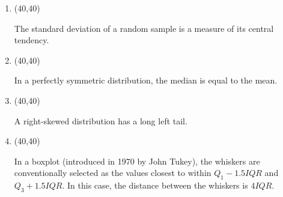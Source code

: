 \documentclass[11pt,twoside]{article}
\numberwithin{equation}{section}
\newcommand{\?}{\stackrel{?}{=}}
\newcommand{\gr}{\color{green!40!black}}
\begin{document}
\begin{enumerate}[\bf (i)]
\item \hfill
  \begin{minipage}{.1\linewidth}
    \framebox(40,40){ \gr }
  \end{minipage}\quad
  \begin{minipage}{.85\linewidth}
    The standard deviation of a random sample is a measure of its central tendency. %
  \end{minipage}

    \smallskip


  
\item \hfill
  \begin{minipage}{.1\linewidth}
    \framebox(40,40){\gr }
  \end{minipage}\quad
  \begin{minipage}{.85\linewidth}
    In a perfectly symmetric distribution, the median is equal to the mean. %
  \end{minipage}

  \smallskip
  
\item \hfill
  \begin{minipage}{.1\linewidth}
    \framebox(40,40){\gr }
  \end{minipage}\quad
  \begin{minipage}{.85\linewidth}
    A right-skewed distribution has a long left tail. %
  \end{minipage}

  \smallskip
  
\item \hfill
  \begin{minipage}{.1\linewidth}
    \framebox(40,40){\gr }
  \end{minipage}\quad
  \begin{minipage}{.85\linewidth}
    In a boxplot (introduced in 1970 by John Tukey), the whiskers are conventionally selected as the values closest to within
    $Q_{1} - 1.5IQR$ and $Q_{3}+1.5IQR$.
    In this case, the distance between the whiskers is $4IQR$. %
  \end{minipage}


\end{enumerate}
\end{document}

